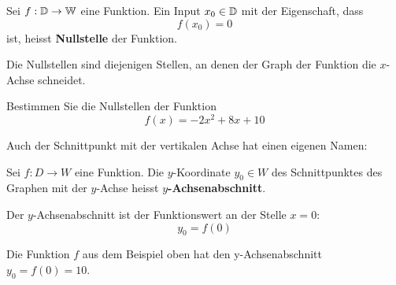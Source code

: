 \begin{deff}[Nullstelle]{}
    Sei \( f : \operatorname{\mathbb{D}} \to \operatorname{\mathbb{W}} \) eine Funktion.
    Ein Input \( x_0 \in \operatorname{\mathbb{D}} \) mit der Eigenschaft, dass
    \[
        f(x_0) = 0
    \]
    ist, heisst \textbf{Nullstelle} der Funktion.

    \medskip

    Die Nullstellen sind diejenigen Stellen, an denen der Graph der Funktion die \(x\)-Achse schneidet.
\end{deff}
\begin{example}
    Bestimmen Sie die Nullstellen der Funktion
    \[f(x) = -2x^2 + 8x + 10\]
    \begin{center}
    \end{center}
\end{example}
Auch der Schnittpunkt mit der vertikalen Achse hat einen eigenen Namen:
\begin{deff}[y-Achsenabschnitt]{}
    Sei \( f : D \to W \) eine Funktion.
    Die \( y \)-Koordinate \( y_0 \in W \) des Schnittpunktes des Graphen mit der \( y \)-Achse
    heisst \textbf{\( y \)-Achsenabschnitt}.

    \medskip

    Der \( y \)-Achsenabschnitt ist der Funktionswert an der Stelle $x=0$:
    \[
        y_0 = f(0)
    \]
\end{deff}

Die Funktion $f$ aus dem Beispiel oben hat den y-Achsenabschnitt $y_0=f(0)=10$.

